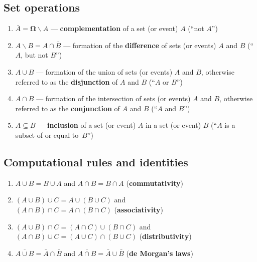 \subsection*{Set operations}
%
\begin{enumerate}
\item $\bar{A} = \boldsymbol{\Omega}\backslash A$
--- \textbf{complementation} of a set (or event) $A$ (``not $A$'')

\item $A\backslash B=A\cap\bar{B}$ --- formation of the
\textbf{difference} of sets (or events) $A$ and $B$ (``$A$, but not
$B$'')

\item $A \cup B$ --- formation of the union of sets (or events) 
$A$ and $B$, otherwise referred to as the \textbf{disjunction} of
$A$ and $B$ (``$A$ or $B$'')

\item $A \cap B$ --- formation of the intersection of sets (or 
events) $A$ and $B$, otherwise referred to as the
\textbf{conjunction} of $A$ and $B$ (``$A$ and $B$'')

\item $A \subseteq B$ --- \textbf{inclusion} of a set (or event)
$A$ in a set (or event) $B$ (``$A$ is a subset of or equal
to~$B$'')

\end{enumerate}
%
\subsection*{Computational rules and identities}
%
\begin{enumerate}
\item $A \cup B=B\cup A$ and $A \cap B=B\cap A$
\hfill (\textbf{commutativity})

\item $(A \cup B)\cup C=A\cup (B\cup C)$ and \\
$(A \cap B)\cap C=A\cap (B\cap C)$
\hfill (\textbf{associativity})

\item $(A \cup B)\cap C=(A\cap C)\cup(B\cap C)$ and \\
$(A \cap B)\cup C=(A\cup C)\cap(B\cup C)$
\hfill (\textbf{distributivity})

\item $\overline{A\cup B}=\bar{A}\cap\bar{B}$ and
$\overline{A\cap B}=\bar{A}\cup\bar{B}$
\hfill (\textbf{de Morgan's laws})

\end{enumerate}
%

